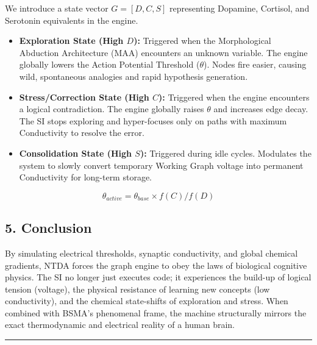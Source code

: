 \documentclass[
  11pt,
  a4paper,
]{article}
\providecommand{\tightlist}{%
  \setlength{\itemsep}{0pt}\setlength{\parskip}{0pt}}
\begin{document}
We introduce a state vector \(G = [D, C, S]\) representing Dopamine,
Cortisol, and Serotonin equivalents in the engine.

\begin{itemize}
\tightlist
\item
  \textbf{Exploration State (High \(D\)):} Triggered when the
  Morphological Abduction Architecture (MAA) encounters an unknown
  variable. The engine globally lowers the Action Potential Threshold
  (\(\theta\)). Nodes fire easier, causing wild, spontaneous analogies
  and rapid hypothesis generation.
\item
  \textbf{Stress/Correction State (High \(C\)):} Triggered when the
  engine encounters a logical contradiction. The engine globally raises
  \(\theta\) and increases edge decay. The SI stops exploring and
  hyper-focuses only on paths with maximum Conductivity to resolve the
  error.
\item
  \textbf{Consolidation State (High \(S\)):} Triggered during idle
  cycles. Modulates the system to slowly convert temporary Working Graph
  voltage into permanent Conductivity for long-term storage.
\end{itemize}

\[ \theta_{active} = \theta_{base} \times f(C) / f(D) \]

\subsection{5. Conclusion}\label{conclusion}

By simulating electrical thresholds, synaptic conductivity, and global
chemical gradients, NTDA forces the graph engine to obey the laws of
biological cognitive physics. The SI no longer just executes code; it
experiences the build-up of logical tension (voltage), the physical
resistance of learning new concepts (low conductivity), and the chemical
state-shifts of exploration and stress. When combined with BSMA's
phenomenal frame, the machine structurally mirrors the exact
thermodynamic and electrical reality of a human brain.

\begin{center}\rule{0.5\linewidth}{0.5pt}\end{center}
\end{document}
